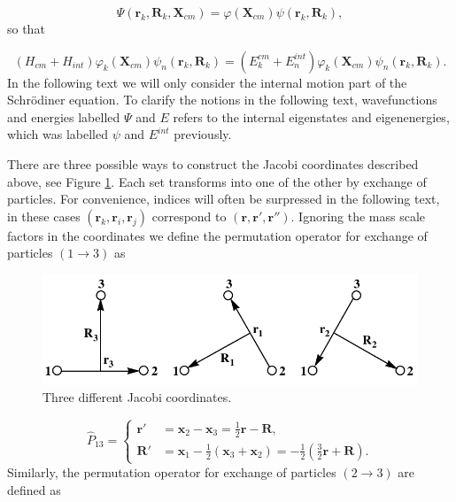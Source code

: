 \documentclass{article}
\numberwithin{equation}{section}
\begin{document}
\begin{equation}
\Psi(\mathbf{r}_k,\mathbf{R}_k,\mathbf{X}_{cm}) = \varphi(\mathbf{X}_{cm})\psi(\mathbf{r}_k,\mathbf{R}_k),
\end{equation}
so that

\begin{equation}
(H_{cm} + H_{int})\varphi_{k}(\mathbf{X}_{cm})\psi_{n}(\mathbf{r}_k,\mathbf{R}_k) = (E_k^{cm} + E_n^{int})\varphi_{k}(\mathbf{X}_{cm})\psi_{n}(\mathbf{r}_k,\mathbf{R}_k).
\end{equation}
In the following text we will only consider the internal motion part of the  Schr{\"o}diner equation. To clarify the notions in the following text, wavefunctions and energies labelled $\Psi$ and $E$ refers to the internal eigenstates and eigenenergies, which was labelled $\psi$ and $E^{int}$ previously. 

There are three possible ways to construct the Jacobi coordinates described above, see Figure \ref{fig:2}. Each set transforms into one of the other by exchange of particles. For convenience, indices will often be surpressed in the following text, in these cases $(\mathbf{r}_{k}, \mathbf{r}_{i}, \mathbf{r}_{j})$ correspond to $(\mathbf{r}, \mathbf{r}', \mathbf{r}'')$. Ignoring the mass scale factors in the coordinates we define the permutation operator for exchange of particles $(1 \rightarrow 3)$ as 

\begin{figure}
	\includegraphics[width=\linewidth]{jacobii.pdf}
	\caption{Three different Jacobi coordinates.}
	\label{fig:2}
\end{figure}

\begin{equation}
\hat{P}_{13} = \left \{ \begin{aligned}
\mathbf{r}' &= \mathbf{x}_2 - \mathbf{x}_3 = \frac{1}{2}\mathbf{r} - \mathbf{R}, \\
\mathbf{R}' &= \mathbf{x}_1 - \frac{1}{2}(\mathbf{x}_3 + \mathbf{x}_2) = -\frac{1}{2}(\frac{3}{2} \mathbf{r} + \mathbf{R}). 
\end{aligned}
\right.
\end{equation}
Similarly, the permutation operator for exchange of particles $(2 \rightarrow 3)$ are defined as
\end{document}
